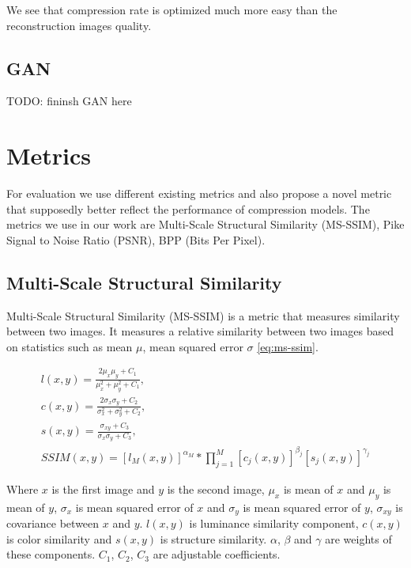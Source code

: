 We see that compression rate is optimized much more easy than the reconstruction images quality.

\subsection{GAN}

TODO: fininsh GAN here

\section{Metrics}

For evaluation we use different existing metrics and also propose a novel metric that supposedly better reflect the performance of compression models. The metrics we use in our work are Multi-Scale Structural Similarity (MS-SSIM), Pike Signal to Noise Ratio (PSNR), BPP (Bits Per Pixel).

\subsection{Multi-Scale Structural Similarity}

Multi-Scale Structural Similarity (MS-SSIM) is a metric that measures similarity between two images. It measures a relative similarity between two images based on statistics such as mean $\mu$, mean squared error $\sigma$ \ref{eq:ms-ssim}.

\begin{equation}
    \label{eq:ms-ssim}
    \begin{split}
        l(x, y) = \frac{2\mu_x\mu_y + C_1}{\mu_x^2 + \mu_y^2 + C_1},\\
        c(x, y) = \frac{2\sigma_x\sigma_y + C_2}{\sigma_x^2 + \sigma_y^2 + C_2},\\
        s(x, y) = \frac{\sigma_{xy} + C_3}{\sigma_x\sigma_y + C_3},\\
        SSIM(x, y) = [l_M(x, y)]^{\alpha_M} * \prod_{j=1}^{M}[c_j(x, y)]^{\beta_j}[s_j(x, y)]^{\gamma_j}
    \end{split}
\end{equation}

Where $x$ is the first image and $y$ is the second image, $\mu_x$ is mean of $x$ and $\mu_y$ is mean of $y$, $\sigma_x$ is mean squared error of $x$ and $\sigma_y$ is mean squared error of $y$, $\sigma_{xy}$ is covariance between $x$ and $y$. $l(x, y)$ is luminance similarity component, $c(x, y)$ is color similarity and $s(x, y)$ is structure similarity. $\alpha$, $\beta$ and $\gamma$ are weights of these components. $C_1$, $C_2$, $C_3$ are adjustable coefficients.

